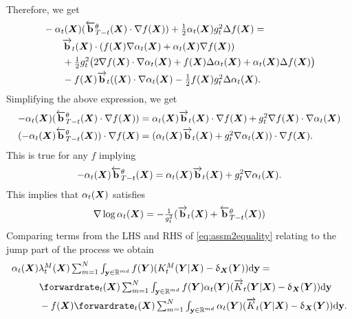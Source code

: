 Therefore, we get 
\begin{align}
    &\textstyle -\alpha_t({\bm{X}}) (\overleftarrow{\mathbf{b}}_{T-t}^\theta({\bm{X}}) \cdot \nabla f({\bm{X}})) + \frac{1}{2} \alpha_t({\bm{X}}) g_t^2 \Delta f({\bm{X}}) = \\
    &\textstyle  \quad \quad \overrightarrow{\mathbf{b}}_t({\bm{X}}) \cdot ( f({\bm{X}}) \nabla \alpha_t({\bm{X}}) + \alpha_t({\bm{X}}) \nabla f({\bm{X}})) \\
  &\textstyle \quad \quad + \frac{1}{2} g_t^2 \big( 2 \nabla f({\bm{X}}) \cdot \nabla \alpha_t({\bm{X}}) +f({\bm{X}}) \Delta \alpha_t({\bm{X}}) + \alpha_t ({\bm{X}}) \Delta f({\bm{X}}) \big) \\
    &\textstyle  \quad \quad - f({\bm{X}}) \overrightarrow{\mathbf{b}}_t(({\bm{X}}) \cdot \nabla \alpha_t({\bm{X}}) - \frac{1}{2} f({\bm{X}}) g_t^2 \Delta \alpha_t({\bm{X}}) . 
\end{align}
Simplifying the above expression, we get
\begin{align}
    -\alpha_t({\bm{X}}) ( \overleftarrow{\mathbf{b}}_{T-t}^\theta({\bm{X}}) \cdot \nabla f({\bm{X}})) &\textstyle = \alpha_t({\bm{X}}) \overrightarrow{\mathbf{b}}_t({\bm{X}}) \cdot \nabla f({\bm{X}}) + g_t^2 \nabla f({\bm{X}}) \cdot \nabla \alpha_t({\bm{X}})\\
    (-\alpha_t({\bm{X}}) \overleftarrow{\mathbf{b}}_{T-t}^\theta({\bm{X}})) \cdot \nabla f({\bm{X}}) &\textstyle = ( \alpha_t({\bm{X}}) \overrightarrow{\mathbf{b}}_t({\bm{X}}) + g_t^2 \nabla \alpha_t({\bm{X}}) ) \cdot \nabla f({\bm{X}}) . 
\end{align}
This is true for any $f$ implying
\begin{align}
    -\alpha_t({\bm{X}}) \overleftarrow{\mathbf{b}}_{T-t}^\theta({\bm{X}}) = \alpha_t({\bm{X}}) \overrightarrow{\mathbf{b}}_t({\bm{X}}) + g_t^2 \nabla \alpha_t({\bm{X}}) . 
\end{align}
This implies that $\alpha_t({\bm{X}})$ satisfies 
\begin{equation}
  \textstyle 
    \nabla \log \alpha_t({\bm{X}}) = - \frac{1}{g_t^2} ( \overrightarrow{\mathbf{b}}_t({\bm{X}}) + \overleftarrow{\mathbf{b}}_{T-t}^\theta ({\bm{X}}))
    \label{eq:alphaDiffRelation}
\end{equation}
Comparing terms from the LHS and RHS of \eqref{eq:assm2equality} relating to the jump part of the process we obtain
\begin{align}
    &\textstyle \alpha_t(\mX) \mrate_t(\mX) \inty f(\mY) ( \mtk_t(\mY | \mX) - \updelta_{\mX}(\mY) ) \rmd \y = \\
    &\textstyle  \hspace{1cm} \forwardrate_t(\mX) \inty f(\mY) \alpha_t(\mY) ( \ftk_t(\mY | \mX) - \updelta_{\mX}(\mY) ) \rmd \y\\
    &\textstyle  \hspace{1cm} - f(\mX) \forwardrate_t(\mX) \inty \alpha_t(\mY) ( \ftk_t(\mY | \mX) - \updelta_{\mX}(\mY) ) \rmd \y .
\end{align}

